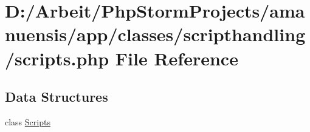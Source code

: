 \hypertarget{a00104}{}\section{D\+:/\+Arbeit/\+Php\+Storm\+Projects/amanuensis/app/classes/scripthandling/scripts.php File Reference}
\label{a00104}
\subsection*{Data Structures}
\begin{DoxyCompactItemize}
\item 
class \hyperlink{a00043}{Scripts}
\end{DoxyCompactItemize}
